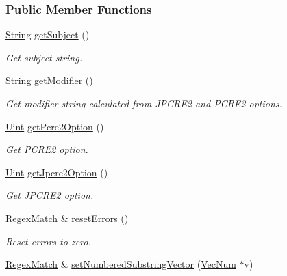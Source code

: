 \subsubsection*{Public Member Functions}
\begin{DoxyCompactItemize}
\item 
\hyperlink{namespacejpcre2_a91f03070152fb228bc116c5a737f1d16}{String} \hyperlink{classjpcre2_1_1RegexMatch_a6ebe41305bcc7262bec814e9e737d056_a6ebe41305bcc7262bec814e9e737d056}{get\+Subject} ()
\begin{DoxyCompactList}\small\item\em Get subject string. \end{DoxyCompactList}\item 
\hyperlink{namespacejpcre2_a91f03070152fb228bc116c5a737f1d16}{String} \hyperlink{classjpcre2_1_1RegexMatch_a909abcce3c02b07cfcd1173a9d0be9ba_a909abcce3c02b07cfcd1173a9d0be9ba}{get\+Modifier} ()
\begin{DoxyCompactList}\small\item\em Get modifier string calculated from J\+P\+C\+R\+E2 and P\+C\+R\+E2 options. \end{DoxyCompactList}\item 
\hyperlink{namespacejpcre2_a078242d38221a13fb3543b9edd78c099}{Uint} \hyperlink{classjpcre2_1_1RegexMatch_a3e6e04f48cd5ee3fb9705214f746f343_a3e6e04f48cd5ee3fb9705214f746f343}{get\+Pcre2\+Option} ()
\begin{DoxyCompactList}\small\item\em Get P\+C\+R\+E2 option. \end{DoxyCompactList}\item 
\hyperlink{namespacejpcre2_a078242d38221a13fb3543b9edd78c099}{Uint} \hyperlink{classjpcre2_1_1RegexMatch_a4ea72774ae5e9a93d649dcb0840efd7f_a4ea72774ae5e9a93d649dcb0840efd7f}{get\+Jpcre2\+Option} ()
\begin{DoxyCompactList}\small\item\em Get J\+P\+C\+R\+E2 option. \end{DoxyCompactList}\item 
\hyperlink{classjpcre2_1_1RegexMatch}{Regex\+Match} \& \hyperlink{classjpcre2_1_1RegexMatch_aa19512638f2f5389384d6b9ad01c70c0_aa19512638f2f5389384d6b9ad01c70c0}{reset\+Errors} ()
\begin{DoxyCompactList}\small\item\em Reset errors to zero. \end{DoxyCompactList}\item 
\hyperlink{classjpcre2_1_1RegexMatch}{Regex\+Match} \& \hyperlink{classjpcre2_1_1RegexMatch_a2c7efe1ec2e13827f670db4ecedcd0a0_a2c7efe1ec2e13827f670db4ecedcd0a0}{set\+Numbered\+Substring\+Vector} (\hyperlink{namespacejpcre2_ac1cf752c8fbb0be78020be3b80e77ce3}{Vec\+Num} $\ast$v)

\end{DoxyCompactItemize}
